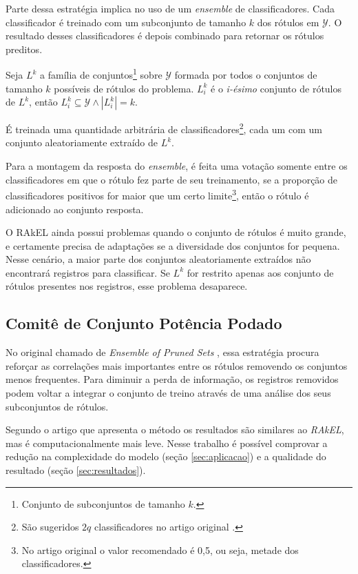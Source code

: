 \documentclass[runningheads,a4paper]{llncs}
\begin{document}
Parte dessa estratégia implica no uso de um \textit{ensemble} de classificadores. Cada classificador é treinado com um subconjunto de tamanho $k$ dos rótulos em $\mathcal{Y}$. O resultado desses classificadores é depois combinado para retornar os rótulos preditos.

Seja $L^k$ a família de conjuntos\footnote{Conjunto de subconjuntos de tamanho $k$.} sobre $\mathcal{Y}$ formada por todos o conjuntos de tamanho $k$ possíveis de rótulos do problema. $L^k_i$ é o \textit{i-ésimo} conjunto de rótulos de $L^k$, então  $L^k_i \subseteq \mathcal{Y} \wedge |L^k_i| = k$.

É treinada uma quantidade arbitrária de classificadores\footnote{São sugeridos $2q$ classificadores no artigo original \cite{Tsoumakas2007-wm}.}, cada um com um conjunto aleatoriamente extraído de $L^k$.

Para a montagem da resposta do \textit{ensemble}, é feita uma votação somente entre os classificadores em que o rótulo fez parte de seu treinamento, se a proporção de classificadores positivos for maior que um certo limite\footnote{No artigo original o valor recomendado é 0,5, ou seja, metade dos classificadores.}, então o rótulo é adicionado ao conjunto resposta.

O RAkEL ainda possui problemas quando o conjunto de rótulos é muito grande, e certamente precisa de adaptações se a diversidade dos conjuntos for pequena. Nesse cenário, a maior parte dos conjuntos aleatoriamente extraídos não encontrará registros para classificar. Se $L^k$ for restrito apenas aos conjunto de rótulos presentes nos registros, esse problema desaparece.
 
 
\subsection{Comitê de Conjunto Potência Podado} \label{subsec:eps}

No original chamado de \textit{Ensemble of Pruned Sets} \cite{Read2008-bt}, essa estratégia procura reforçar as correlações mais importantes entre os rótulos removendo os conjuntos menos frequentes. Para diminuir a perda de informação, os registros removidos podem voltar a integrar o conjunto de treino através de uma análise dos seus subconjuntos de rótulos.

Segundo o artigo que apresenta o método os resultados são similares ao \textit{RAkEL}, mas é computacionalmente mais leve. Nesse trabalho é possível comprovar a redução na complexidade do modelo (seção \ref{sec:aplicacao}) e a qualidade do resultado (seção \ref{sec:resultados}).
\end{document}

